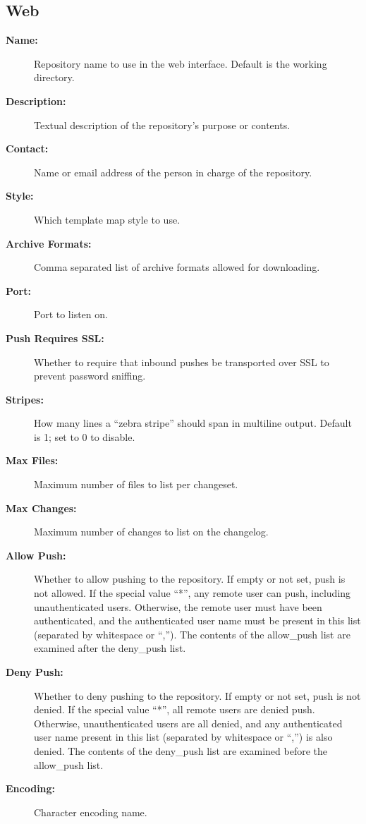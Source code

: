 \documentclass[letterpaper,10pt,english]{manual}
\begin{document}
\subsection{Web}
\begin{description}
\item[\textbf{Name:}]
Repository name to use in the web interface.
Default is the working directory.

\item[\textbf{Description:}]
Textual description of the repository's purpose or
contents.

\item[\textbf{Contact:}]
Name or email address of the person in charge of the
repository.

\item[\textbf{Style:}]
Which template map style to use.

\item[\textbf{Archive Formats:}]
Comma separated list of archive formats allowed for
downloading.

\item[\textbf{Port:}]
Port to listen on.

\item[\textbf{Push Requires SSL:}]
Whether to require that inbound pushes be transported
over SSL to prevent password sniffing.

\item[\textbf{Stripes:}]
How many lines a ``zebra stripe'' should span in multiline output.
Default is 1; set to 0 to disable.

\item[\textbf{Max Files:}]
Maximum number of files to list per changeset.

\item[\textbf{Max Changes:}]
Maximum number of changes to list on the changelog.

\item[\textbf{Allow Push:}]
Whether to allow pushing to the repository. If empty or not
set, push is not allowed. If the special value ``*'', any remote
user can push, including unauthenticated users. Otherwise, the
remote user must have been authenticated, and the authenticated
user name must be present in this list (separated by whitespace
or ``,''). The contents of the allow\_push list are examined after
the deny\_push list.

\item[\textbf{Deny Push:}]
Whether to deny pushing to the repository. If empty or not set,
push is not denied. If the special value ``*'', all remote users
are denied push. Otherwise, unauthenticated users are all
denied, and any authenticated user name present in this list
(separated by whitespace or ``,'') is also denied. The contents
of the deny\_push list are examined before the allow\_push list.

\item[\textbf{Encoding:}]
Character encoding name.

\end{description}
\hypertarget{module-proxy.settings}{}
\end{document}
